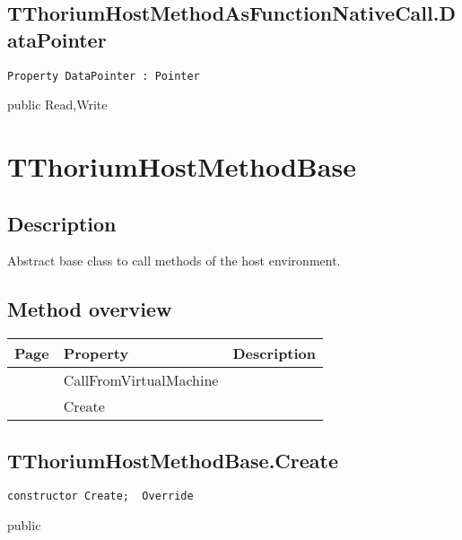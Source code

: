 \subsection{TThoriumHostMethodAsFunctionNativeCall.DataPointer}
\label{thoriumcorepkg:thorium:tthoriumhostmethodasfunctionnativecall:datapointer}
\begin{FPCList}
\Declaration 

\begin{verbatim}
Property DataPointer : Pointer
\end{verbatim}
\Visibility
public
\Access
Read,Write
\end{FPCList}
\section{TThoriumHostMethodBase}
\label{thoriumcorepkg:thorium:tthoriumhostmethodbase}
\subsection{Description}
Abstract base class to call methods of the host environment.%
\subsection{Method overview}
\label{thoriumcorepkg:thorium:tthoriumhostmethodbase:methods}
\begin{tabularx}{\textwidth}{llX}
Page & Property & Description  \\ \hline
\pageref{thoriumcorepkg:thorium:tthoriumhostmethodbase:callfromvirtualmachine} & CallFromVirtualMachine  &  \\
\pageref{thoriumcorepkg:thorium:tthoriumhostmethodbase:create} & Create  &  \\
\hline
\end{tabularx}
\subsection{TThoriumHostMethodBase.Create}
\label{thoriumcorepkg:thorium:tthoriumhostmethodbase:create}
\begin{FPCList}
\Declaration 

\begin{verbatim}
constructor Create;  Override
\end{verbatim}
\Visibility
public
\end{FPCList}
